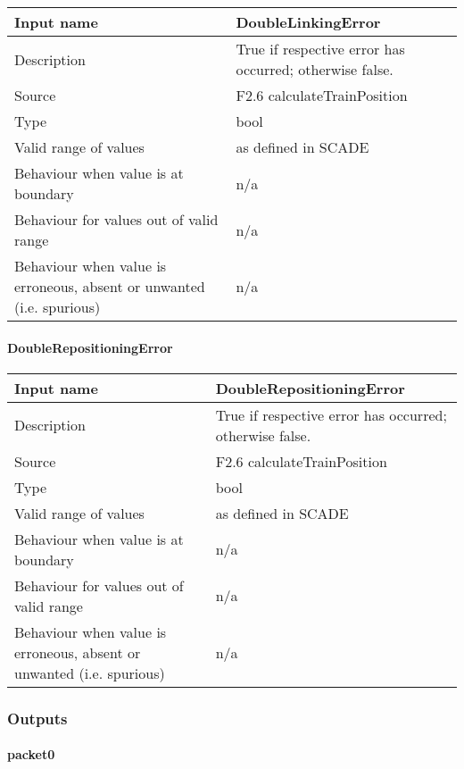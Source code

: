\begin{longtable}{p{}p{}}
\toprule
Input name				& DoubleLinkingError \\
\midrule
Description				& True if respective error has occurred; otherwise false. \\
\midrule
Source					& F2.6 calculateTrainPosition \\ 
\midrule
Type					& bool \\
\midrule
Valid range of values	& as defined in SCADE \\
\midrule
Behaviour when value is at boundary	& n/a \\
\midrule
Behaviour for values out of valid range	& n/a \\
\midrule
Behaviour when value is erroneous, absent or unwanted (i.e. spurious) & n/a \\
\bottomrule
\end{longtable}

\paragraph{DoubleRepositioningError}

\begin{longtable}{p{}p{}}
\toprule
Input name				& DoubleRepositioningError \\
\midrule
Description				& True if respective error has occurred; otherwise false. \\
\midrule
Source					& F2.6 calculateTrainPosition \\ 
\midrule
Type					& bool \\
\midrule
Valid range of values	& as defined in SCADE \\
\midrule
Behaviour when value is at boundary	& n/a \\
\midrule
Behaviour for values out of valid range	& n/a \\
\midrule
Behaviour when value is erroneous, absent or unwanted (i.e. spurious) & n/a \\
\bottomrule
\end{longtable}


\subsubsection{Outputs}\label{s:provide_position_report_outputs}

\paragraph{packet0}

